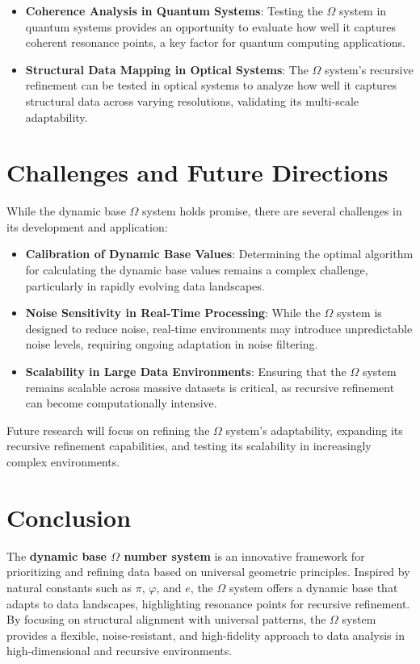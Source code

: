 \documentclass{article}
\begin{document}
\begin{itemize}
    \item \textbf{Coherence Analysis in Quantum Systems}: Testing the $\Omega$ system in quantum systems provides an opportunity to evaluate how well it captures coherent resonance points, a key factor for quantum computing applications.
    \item \textbf{Structural Data Mapping in Optical Systems}: The $\Omega$ system’s recursive refinement can be tested in optical systems to analyze how well it captures structural data across varying resolutions, validating its multi-scale adaptability.
\end{itemize}

\section{Challenges and Future Directions}

While the dynamic base $\Omega$ system holds promise, there are several challenges in its development and application:

\begin{itemize}
    \item \textbf{Calibration of Dynamic Base Values}: Determining the optimal algorithm for calculating the dynamic base values remains a complex challenge, particularly in rapidly evolving data landscapes.
    \item \textbf{Noise Sensitivity in Real-Time Processing}: While the $\Omega$ system is designed to reduce noise, real-time environments may introduce unpredictable noise levels, requiring ongoing adaptation in noise filtering.
    \item \textbf{Scalability in Large Data Environments}: Ensuring that the $\Omega$ system remains scalable across massive datasets is critical, as recursive refinement can become computationally intensive.
\end{itemize}

Future research will focus on refining the $\Omega$ system’s adaptability, expanding its recursive refinement capabilities, and testing its scalability in increasingly complex environments.

\section{Conclusion}

The \textbf{dynamic base $\Omega$ number system} is an innovative framework for prioritizing and refining data based on universal geometric principles. Inspired by natural constants such as $\pi$, $\varphi$, and $e$, the $\Omega$ system offers a dynamic base that adapts to data landscapes, highlighting resonance points for recursive refinement. By focusing on structural alignment with universal patterns, the $\Omega$ system provides a flexible, noise-resistant, and high-fidelity approach to data analysis in high-dimensional and recursive environments.
\end{document}
